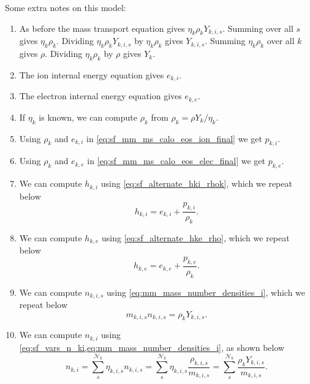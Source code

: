 \documentclass[a4paper,11pt]{report}
\begin{document}
Some extra notes on this model:
\begin{enumerate}
    \item As before the mass transport equation gives $\eta_k \rho_k Y_{k,i,s}$. Summing over all $s$ gives $\eta_k \rho_k$. Dividing $\eta_k \rho_k Y_{k,i,s}$ by $\eta_k \rho_k$ gives $Y_{k,i,s}$. Summing $\eta_k \rho_k$ over all $k$ gives $\rho$. Dividing $\eta_k \rho_k$ by $\rho$ gives $Y_k$.

    \item The ion internal energy equation gives $e_{k,i}$. 

    \item The electron internal energy equation gives $e_{k,e}$.

    \item If $\eta_k$ is known, we can compute $\rho_k$ from $\rho_k = \rho Y_k / \eta_k$.

    \item Using $\rho_k$ and $e_{k,i}$ in \cref{eq:sf_mm_ms_calo_eos_ion_final} we get $p_{k,i}$.

    \item Using $\rho_k$ and $e_{k,e}$ in \cref{eq:sf_mm_ms_calo_eos_elec_final} we get $p_{k,e}$.

    \item We can compute $h_{k,i}$ using \cref{eq:sf_alternate_hki_rhok}, which we repeat below
    \begin{equation*}
        h_{k,i} = e_{k,i} + \frac{p_{k,i}}{\rho_k}.
    \end{equation*}

    \item We can compute $h_{k,e}$ using \cref{eq:sf_alternate_hke_rho}, which we repeat below
    \begin{equation*}
        h_{k,e} = e_{k,e} + \frac{p_{k,e}}{\rho_k}.
    \end{equation*}

    \item We can compute $n_{k,i,s}$ using \cref{eq:mm_mass_number_densities_i}, which we repeat below
    \begin{equation*}
        m_{k,i,s} n_{k,i,s} = \rho_k Y_{k,i,s}.
    \end{equation*}

    \item We can compute $n_{k,i}$ using \cref{eq:sf_vars_n_ki,eq:mm_mass_number_densities_i}, as shown below
    \begin{equation}
        n_{k,i} = \sum_s^{\mathcal{N}_k} \eta_{k,i,s} n_{k,i,s} = \sum_s^{\mathcal{N}_k} \eta_{k,i,s} \frac{\rho_{k,i,s}}{m_{k,i,s}} = \sum_s^{\mathcal{N}_k} \frac{\rho_k Y_{k,i,s}}{m_{k,i,s}}.
    \end{equation}
    

\end{enumerate}
\end{document}
